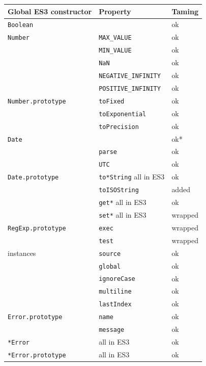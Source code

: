 \documentclass[letterpaper,twocolumn,10pt]{article}
\newcommand{\code}[1]{{\tt {#1}}}              %
\begin{document}
\begin{table}
\begin{tabular}{lll}
  Global ES3 constructor         & Property                    & Taming \\
  \hline 
  \code{Boolean}                 &                             & ok \\
  \hline
  \code{Number}                  & \code{MAX\_VALUE}           & ok \\
                                 & \code{MIN\_VALUE}           & ok \\
                                 & \code{NaN}                  & ok \\
                                 & \code{NEGATIVE\_INFINITY}   & ok \\
                                 & \code{POSITIVE\_INFINITY}   & ok \\
  \code{Number.prototype}        & \code{toFixed}              & ok \\
                                 & \code{toExponential}        & ok \\
                                 & \code{toPrecision}          & ok \\
  \hline
  \code{Date}                    &                             & ok* \\
                                 & \code{parse}                & ok \\
                                 & \code{UTC}                  & ok \\
  \code{Date.prototype}          & \code{to*String} all in ES3 & ok \\
                                 & \code{toISOString}          & added \\
                                 & \code{get*}      all in ES3 & ok \\
                                 & \code{set*}      all in ES3 & wrapped \\
  \hline
  \code{RegExp.prototype}        & \code{exec}                 & wrapped \\
                                 & \code{test}                 & wrapped \\
  instances                      & \code{source}               & ok \\
                                 & \code{global}               & ok \\
                                 & \code{ignoreCase}           & ok \\
                                 & \code{multiline}            & ok \\
                                 & \code{lastIndex}            & ok \\
  \hline 
  \code{Error.prototype}         & \code{name}                 & ok \\
                                 & \code{message}              & ok \\
  \code{*Error}                  &                  all in ES3 & ok \\
  \code{*Error.prototype}        &                  all in ES3 & ok \\
  

\end{tabular}
\end{table}
\end{document}
